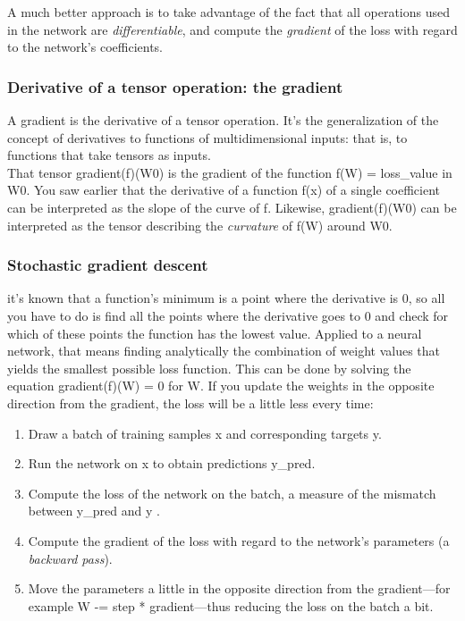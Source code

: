 \documentclass{article}
\numberwithin{equation}{section} %
\begin{document}
A much better approach is to take advantage of the fact that all operations used in the network are \textit{differentiable}, and compute the \textit{gradient} of the loss with regard to the network’s coefficients. \\


\subsubsection{Derivative of a tensor operation: the gradient}

A gradient is the derivative of a tensor operation. It’s the generalization of the concept of derivatives to functions of multidimensional inputs: that is, to functions that take tensors as inputs. \\

That tensor gradient(f)(W0) is the gradient of the function f(W) = loss\_value in W0. You saw earlier that the derivative of a function f(x) of a single coefficient can be interpreted as the slope of the curve of f. Likewise, gradient(f)(W0) can be interpreted as the tensor describing the \textit{curvature} of f(W) around W0. \\

\subsubsection{Stochastic gradient descent}

it’s known that a function’s minimum is a point where the derivative is 0, so all
you have to do is find all the points where the derivative goes to 0 and check for which of these points the function has the lowest value. Applied to a neural network, that means finding analytically the combination of weight values that yields the smallest possible loss function. This can be done by solving the equation gradient(f)(W) = 0 for W.  If you update the weights in the opposite direction from the gradient, the loss will be a little less every time:

\begin{enumerate}
	\item Draw a batch of training samples x and corresponding targets y.
	\item Run the network on x to obtain predictions y\_pred.
	\item  Compute the loss of the network on the batch, a measure of the mismatch
	between y\_pred and y .
	\item Compute the gradient of the loss with regard to the network’s parameters (a \textit{backward pass}).
	\item Move the parameters a little in the opposite direction from the gradient—for example W -= step * gradient—thus reducing the loss on the batch a bit.
\end{enumerate}
\end{document}

